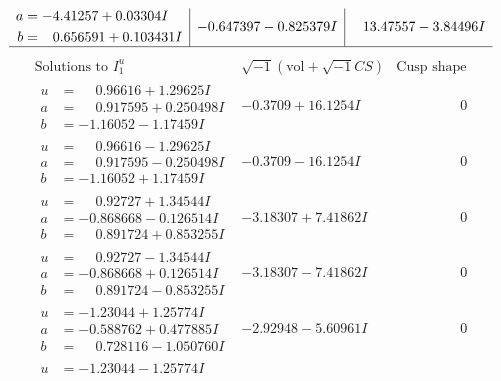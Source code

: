 \documentclass[1p]{elsarticle_modified}
\theoremstyle{definition}
\newcommand{\I}{\sqrt{-1}}
\begin{document}
$$\begin{array}{c|c|c}
\begin{aligned}
a &= -4.41257 + 0.03304 I \\
b &= \phantom{-}0.656591 + 0.103431 I\end{aligned}
 & -0.647397 - 0.825379 I & \phantom{-}13.47557 - 3.84496 I\\
 \hline 
 \end{array}$$\newpage$$\begin{array}{c|c|c}  
\text{Solutions to }I^u_{1}& \I (\text{vol} + \sqrt{-1}CS) & \text{Cusp shape}\\
 \hline 
\begin{aligned}
u &= \phantom{-}0.96616 + 1.29625 I \\
a &= \phantom{-}0.917595 + 0.250498 I \\
b &= -1.16052 - 1.17459 I\end{aligned}
 & -0.3709 + 16.1254 I & \phantom{-0.000000 } 0 \\ \hline\begin{aligned}
u &= \phantom{-}0.96616 - 1.29625 I \\
a &= \phantom{-}0.917595 - 0.250498 I \\
b &= -1.16052 + 1.17459 I\end{aligned}
 & -0.3709 - 16.1254 I & \phantom{-0.000000 } 0 \\ \hline\begin{aligned}
u &= \phantom{-}0.92727 + 1.34544 I \\
a &= -0.868668 - 0.126514 I \\
b &= \phantom{-}0.891724 + 0.853255 I\end{aligned}
 & -3.18307 + 7.41862 I & \phantom{-0.000000 } 0 \\ \hline\begin{aligned}
u &= \phantom{-}0.92727 - 1.34544 I \\
a &= -0.868668 + 0.126514 I \\
b &= \phantom{-}0.891724 - 0.853255 I\end{aligned}
 & -3.18307 - 7.41862 I & \phantom{-0.000000 } 0 \\ \hline\begin{aligned}
u &= -1.23044 + 1.25774 I \\
a &= -0.588762 + 0.477885 I \\
b &= \phantom{-}0.728116 - 1.050760 I\end{aligned}
 & -2.92948 - 5.60961 I & \phantom{-0.000000 } 0 \\ \hline\begin{aligned}
u &= -1.23044 - 1.25774 I \\

\end{aligned}
\end{array}$$
\end{document}
